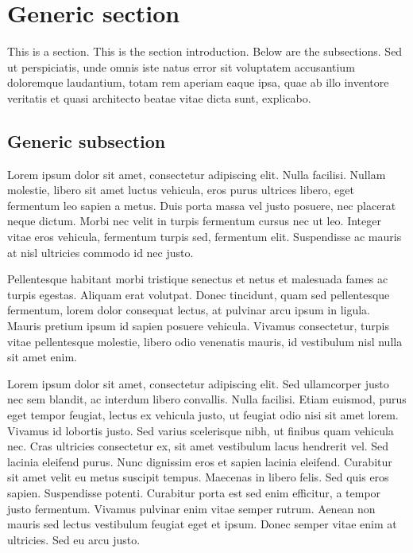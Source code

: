 \documentclass[letterpaper,11pt,leqno]{article}
\begin{document}
\section{Generic section}\label{s:section}

This is a section. This is the section introduction. Below are the subsections. Sed ut perspiciatis, unde omnis iste natus error sit voluptatem accusantium doloremque laudantium, totam rem aperiam eaque ipsa, quae ab illo inventore veritatis et quasi architecto beatae vitae dicta sunt, explicabo. 

\subsection{Generic subsection}

Lorem ipsum dolor sit amet, consectetur adipiscing elit. Nulla facilisi. Nullam molestie, libero sit amet luctus vehicula, eros purus ultrices libero, eget fermentum leo sapien a metus. Duis porta massa vel justo posuere, nec placerat neque dictum. Morbi nec velit in turpis fermentum cursus nec ut leo. Integer vitae eros vehicula, fermentum turpis sed, fermentum elit. Suspendisse ac mauris at nisl ultricies commodo id nec justo. 

Pellentesque habitant morbi tristique senectus et netus et malesuada fames ac turpis egestas. Aliquam erat volutpat. Donec tincidunt, quam sed pellentesque fermentum, lorem dolor consequat lectus, at pulvinar arcu ipsum in ligula. Mauris pretium ipsum id sapien posuere vehicula. Vivamus consectetur, turpis vitae pellentesque molestie, libero odio venenatis mauris, id vestibulum nisl nulla sit amet enim.

Lorem ipsum dolor sit amet, consectetur adipiscing elit. Sed ullamcorper justo nec sem blandit, ac interdum libero convallis. Nulla facilisi. Etiam euismod, purus eget tempor feugiat, lectus ex vehicula justo, ut feugiat odio nisi sit amet lorem. Vivamus id lobortis justo. Sed varius scelerisque nibh, ut finibus quam vehicula nec. Cras ultricies consectetur ex, sit amet vestibulum lacus hendrerit vel. Sed lacinia eleifend purus. Nunc dignissim eros et sapien lacinia eleifend. Curabitur sit amet velit eu metus suscipit tempus. Maecenas in libero felis. Sed quis eros sapien. Suspendisse potenti. Curabitur porta est sed enim efficitur, a tempor justo fermentum. Vivamus pulvinar enim vitae semper rutrum. Aenean non mauris sed lectus vestibulum feugiat eget et ipsum. Donec semper vitae enim at ultricies. Sed eu arcu justo.
\end{document}
